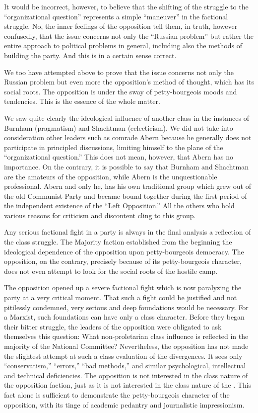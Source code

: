 It would be incorrect, however, to believe that the shifting of the struggle to the “organizational question” represents a simple “maneuver” in the factional struggle. No, the inner feelings of the opposition tell them, in truth, however confusedly, that the issue concerns not only the “Russian problem” but rather the entire approach to political problems in general, including also the methods of building the party. And this is in a certain sense correct.

We too have attempted above to prove that the issue concerns not only the Russian problem but even more the opposition’s method of thought, which has its social roots. The opposition is under the sway of petty-bourgeois moods and tendencies. This is the essence of the whole matter.

We saw quite clearly the ideological influence of another class in the instances of Burnham (pragmatism) and Shachtman (eclecticism). We did not take into consideration other leaders such as comrade Abern because he generally does not participate in principled discussions, limiting himself to the plane of the “organizational question.” This does not mean, however, that Abern has no importance. On the contrary, it is possible to say that Burnham and Shachtman are the amateurs of the opposition, while Abern is the unquestionable professional. Abern and only he, has his own traditional group which grew out of the old Communist Party and became bound together during the first period of the independent existence of the “Left Opposition.” All the others who hold various reasons for criticism and discontent cling to this group.

Any serious factional fight in a party is always in the final analysis a reflection of the class struggle. The Majority faction established from the beginning the ideological dependence of the opposition upon petty-bourgeois democracy. The opposition, on the contrary, precisely because of its petty-bourgeois character, does not even attempt to look for the social roots of the hostile camp.

The opposition opened up a severe factional fight which is now paralyzing the party at a very critical moment. That such a fight could be justified and not pitilessly condemned, very serious and deep foundations would be necessary. For a Marxist, such foundations can have only a class character. Before they began their bitter struggle, the leaders of the opposition were obligated to ask themselves this question: What non-proletarian class influence is reflected in the majority of the National Committee? Nevertheless, the opposition has not made the slightest attempt at such a class evaluation of the divergences. It sees only “conservatism,” “errors,” “bad methods,” and similar psychological, intellectual and technical deficiencies. The opposition is not interested in the class nature of the opposition faction, just as it is not interested in the class nature of the \USSR. This fact alone is sufficient to demonstrate the petty-bourgeois character of the opposition, with its tinge of academic pedantry and journalistic impressionism.

